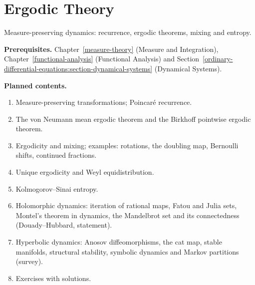 \chapter{Ergodic Theory}\label{ergodic-theory}

Measure-preserving dynamics: recurrence, ergodic theorems, mixing and entropy.

\noindent\textbf{Prerequisites.} Chapter~\ref{measure-theory} (Measure and Integration), Chapter~\ref{functional-analysis} (Functional Analysis) and Section~\ref{ordinary-differential-equations:section-dynamical-systems} (Dynamical Systems).

\noindent\textbf{Planned contents.}
\begin{enumerate}
\item Measure-preserving transformations; Poincar\'e recurrence.
\item The von Neumann mean ergodic theorem and the Birkhoff pointwise ergodic theorem.
\item Ergodicity and mixing; examples: rotations, the doubling map, Bernoulli shifts, continued fractions.
\item Unique ergodicity and Weyl equidistribution.
\item Kolmogorov--Sinai entropy.
\item Holomorphic dynamics: iteration of rational maps, Fatou and Julia sets, Montel's theorem in dynamics, the Mandelbrot set and its connectedness (Douady--Hubbard, statement).
\item Hyperbolic dynamics: Anosov diffeomorphisms, the cat map, stable manifolds, structural stability, symbolic dynamics and Markov partitions (survey).
\item Exercises with solutions.
\end{enumerate}
